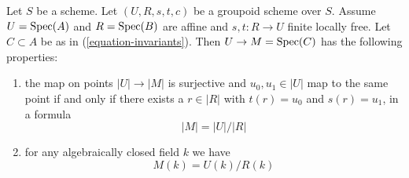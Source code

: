 \begin{lemma}
\label{lemma-points}
Let $S$ be a scheme. Let $(U, R, s, t, c)$ be a groupoid scheme over $S$.
Assume $U = \mathop{\mathrm{Spec}}(A)$ and $R = \mathop{\mathrm{Spec}}(B)$ are affine and
$s, t : R \to U$ finite locally free. Let $C \subset A$ be as in
(\ref{equation-invariants}). Then $U \to M = \mathop{\mathrm{Spec}}(C)$ has
the following properties:
\begin{enumerate}
\item the map on points $|U| \to |M|$ is surjective and
$u_0, u_1 \in |U|$ map to the same point if and only if
there exists a $r \in |R|$ with $t(r) = u_0$ and $s(r) = u_1$, in
a formula
$$
|M| = |U|/|R|
$$
\item for any algebraically closed field $k$ we have
$$
M(k) = U(k)/R(k)
$$
\end{enumerate}
\end{lemma}

